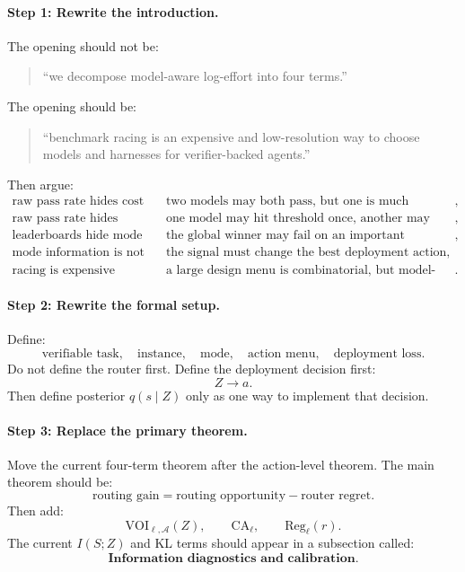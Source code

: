 \documentclass{article}
\begin{document}
\paragraph{Step 1: Rewrite the introduction.}
The opening should not be:
\begin{quote}
``we decompose model-aware log-effort into four terms.''
\end{quote}
The opening should be:
\begin{quote}
``benchmark racing is an expensive and low-resolution way to choose
models and harnesses for verifier-backed agents.''
\end{quote}
Then argue:
\[
\begin{array}{ll}
    \text{raw pass rate hides cost} &
    \text{two models may both pass, but one is much cheaper or faster},\\
    \text{raw pass rate hides persistence} &
    \text{one model may hit threshold once, another may stay above threshold},\\
    \text{leaderboards hide mode structure} &
    \text{the global winner may fail on an important submode},\\
    \text{mode information is not enough} &
    \text{the signal must change the best deployment action},\\
    \text{racing is expensive} &
    \text{a large design menu is combinatorial, but model-mode cells are reusable}.
\end{array}
\]

\paragraph{Step 2: Rewrite the formal setup.}
Define:
\[
    \text{verifiable task},\quad
    \text{instance},\quad
    \text{mode},\quad
    \text{action menu},\quad
    \text{deployment loss}.
\]
Do not define the router first.
Define the deployment decision first:
\[
    Z \longrightarrow a.
\]
Then define posterior \(q(s\mid Z)\) only as one way to implement that decision.

\paragraph{Step 3: Replace the primary theorem.}
Move the current four-term theorem after the action-level theorem.
The main theorem should be:
\[
    \text{routing gain}=\text{routing opportunity}-\text{router regret}.
\]
Then add:
\[
    \mathrm{VOI}_{\ell,\mathcal A}(Z),
    \qquad
    \mathrm{CA}_\ell,
    \qquad
    \mathrm{Reg}_\ell(r).
\]
The current \(I(S;Z)\) and KL terms should appear in a subsection called:
\[
    \textbf{Information diagnostics and calibration.}
\]
\end{document}
